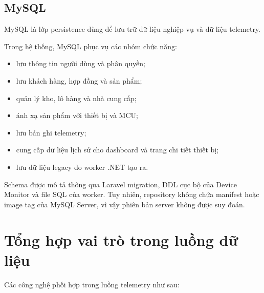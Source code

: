 \subsection{MySQL}

MySQL là lớp persistence dùng để lưu trữ dữ liệu nghiệp vụ và dữ liệu
telemetry.

Trong hệ thống, MySQL phục vụ các nhóm chức năng:

\begin{itemize}
    \item lưu thông tin người dùng và phân quyền;
    \item lưu khách hàng, hợp đồng và sản phẩm;
    \item quản lý kho, lô hàng và nhà cung cấp;
    \item ánh xạ sản phẩm với thiết bị và MCU;
    \item lưu bản ghi telemetry;
    \item cung cấp dữ liệu lịch sử cho dashboard và trang chi tiết thiết bị;
    \item lưu dữ liệu legacy do worker .NET tạo ra.
\end{itemize}

Schema được mô tả thông qua Laravel migration, DDL cục bộ của Device Monitor và
file SQL của worker. Tuy nhiên, repository không chứa manifest hoặc image tag
của MySQL Server, vì vậy phiên bản server không được suy đoán.

\section{Tổng hợp vai trò trong luồng dữ liệu}

Các công nghệ phối hợp trong luồng telemetry như sau:

